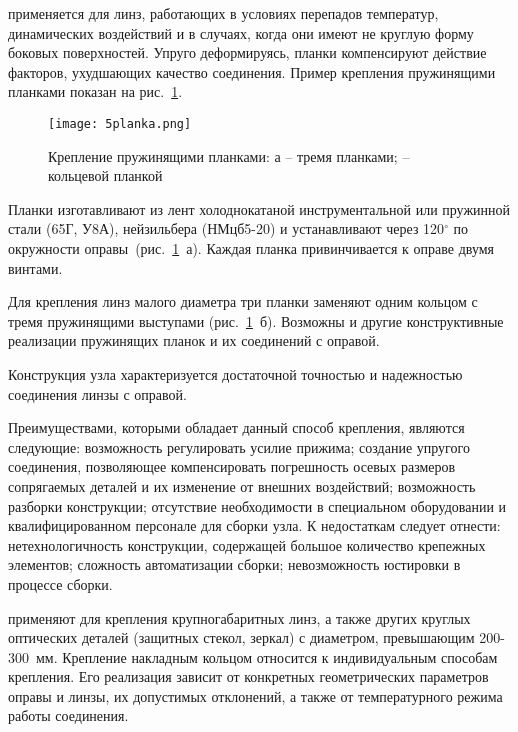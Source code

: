   применяется для линз, работающих в условиях перепадов температур, динамических воздействий и в случаях, когда они имеют не круглую форму боковых поверхностей. 
Упруго деформируясь, планки компенсируют действие факторов, ухудшающих качество соединения. 
Пример крепления пружинящими планками показан на рис.~\ref{pic:5planka}.

\begin{figure}[h!]
	\texttt{[image: 5planka.png]}
	\caption[Крепление пружинящими планками]{ Крепление пружинящими планками: а -- тремя планками;  -- кольцевой планкой }
	\label{pic:5planka}
\end{figure}

Планки изготавливают из лент холоднокатаной инструментальной или пружинной стали (65Г, У8А), нейзильбера (НМцб5-20) и устанавливают через 120$^\circ$ по окружности оправы~(рис.~\ref{pic:5planka}~а). Каждая планка привинчивается к оправе двумя винтами.

Для крепления линз малого диаметра три планки заменяют одним кольцом с тремя пружинящими выступами (рис.~\ref{pic:5planka}~б). Возможны и другие конструктивные реализации пружинящих планок и их соединений с оправой.

Конструкция узла характеризуется достаточной точностью и надежностью соединения линзы с оправой.

Преимуществами, которыми обладает данный способ крепления, являются следующие: возможность регулировать усилие прижима; создание упругого соединения, позволяющее компенсировать погрешность осевых размеров сопрягаемых деталей и их изменение от внешних воздействий; возможность разборки конструкции; отсутствие необходимости в специальном оборудовании и квалифицированном персонале для сборки узла. К недостаткам следует отнести: нетехнологичность конструкции, содержащей большое количество крепежных элементов; сложность автоматизации сборки; невозможность юстировки в процессе сборки.

  применяют для крепления крупногабаритных линз, а также других круглых оптических деталей (защитных стекол, зеркал) с диаметром, превышающим 200-300~мм. 
Крепление накладным кольцом относится к индивидуальным способам крепления. 
Его реализация зависит от конкретных геометрических параметров оправы и линзы, их допустимых отклонений, а также от температурного режима работы соединения.

